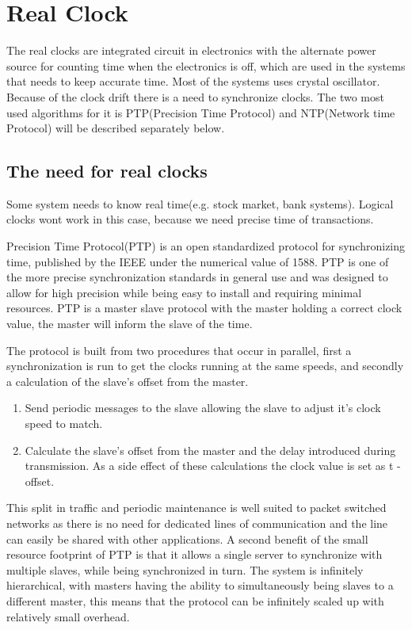 \section{Real Clock}\label{sc:realClock}

The real clocks are integrated circuit in electronics with the alternate power source for counting time when the electronics is off, which are used in the systems that needs to keep accurate time. Most of the systems uses crystal oscillator. Because of the clock drift there is a need to synchronize clocks. The two most used algorithms for it is PTP(Precision Time Protocol) and NTP(Network time Protocol) will be described separately below.

\subsection{The need for real clocks}
Some system needs to know real time(e.g. stock market, bank systems). Logical clocks wont work in this
case, because we need precise time of transactions.



Precision Time Protocol(PTP) is an open standardized protocol for synchronizing time, published by the IEEE under the numerical value of 1588. PTP is one of the more precise synchronization standards in general use and was designed to allow for high precision while being easy to install and requiring minimal resources. PTP is a master slave protocol with the master holding a correct clock value, the master will inform the slave of the time.

\noindent The protocol is built from two procedures that occur in parallel, first a synchronization is run to get the clocks running at the same speeds, and secondly a calculation of the slave's offset from the master. 
\begin{enumerate}
\item Send periodic messages to the slave allowing the slave to adjust it's clock speed to match.
\item Calculate the slave's offset from the master and the delay introduced during transmission. As a side effect of these calculations the clock value is set as t - offset.
\end{enumerate}

\noindent This split in traffic and periodic maintenance is well suited to packet switched networks as there is no need for dedicated lines of communication and the line can easily be shared with other applications. A second benefit of the small resource footprint of PTP is that it allows a single server to synchronize with multiple slaves, while being synchronized in turn. The system is infinitely hierarchical, with masters having the ability to simultaneously being slaves to a different master, this means that the protocol can be infinitely scaled up with relatively small overhead.

